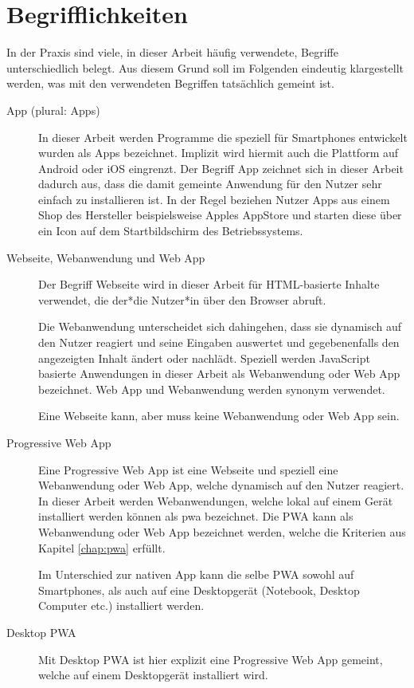 \section{Begrifflichkeiten}
In der Praxis sind viele, in dieser Arbeit häufig verwendete, Begriffe unterschiedlich belegt. Aus diesem Grund soll im Folgenden eindeutig klargestellt werden, was mit den verwendeten Begriffen tatsächlich gemeint ist.

\begin{description}
	\item [App (plural: Apps)]
		In dieser Arbeit werden Programme die speziell für Smartphones entwickelt wurden als Apps bezeichnet. Implizit wird hiermit auch die Plattform auf Android oder iOS eingrenzt. Der Begriff App zeichnet sich in dieser Arbeit dadurch aus, dass die damit gemeinte Anwendung für den Nutzer sehr einfach zu installieren ist. In der Regel beziehen Nutzer Apps aus einem Shop des Hersteller beispielsweise Apples AppStore und starten diese über ein Icon auf dem Startbildschirm des Betriebssystems.
		
	\item [Webseite, Webanwendung und Web App]
		Der Begriff Webseite wird in dieser Arbeit für HTML-basierte Inhalte verwendet, die der*die Nutzer*in über den Browser abruft.
		
		Die Webanwendung unterscheidet sich dahingehen, dass sie dynamisch auf den Nutzer reagiert und seine Eingaben auswertet und gegebenenfalls den angezeigten Inhalt ändert oder nachlädt. Speziell werden JavaScript basierte Anwendungen in dieser Arbeit als Webanwendung oder Web App bezeichnet. Web App und Webanwendung werden synonym verwendet.
		
		Eine Webseite kann, aber muss keine Webanwendung oder Web App sein.
	
	\item [Progressive Web App]
		Eine Progressive Web App ist eine Webseite und speziell eine Webanwendung oder Web App, welche dynamisch auf den Nutzer reagiert.
		In dieser Arbeit werden Webanwendungen, welche lokal auf einem Gerät installiert werden können als \acf{pwa} bezeichnet. Die PWA kann als Webanwendung oder Web App bezeichnet werden, welche die Kriterien aus Kapitel \ref{chap:pwa} erfüllt.
		
		Im Unterschied zur nativen App kann die selbe PWA sowohl auf Smartphones, als auch auf eine Desktopgerät (Notebook, Desktop Computer etc.) installiert werden.
		
	\item [Desktop PWA]
		Mit Desktop PWA ist hier explizit eine Progressive Web App gemeint, welche auf einem Desktopgerät installiert wird.
			

\end{description}
